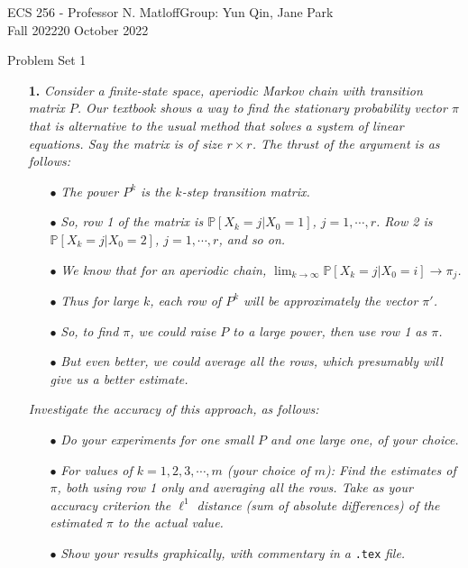 \documentclass [10pt] {article}
\newcommand{\ds}{\displaystyle}
\renewcommand{\P}{\mathbb{P}}
\begin{document}
{\noindent}ECS 256 - Professor N. Matloff\hfill Group: Yun Qin, Jane Park\\
Fall 2022\hfill 20 October 2022
\begin{center}{\Large Problem Set 1}\end{center}
\begin{enumerate}
\item[{\bf1.}] {\it Consider a finite-state space, aperiodic Markov chain with transition matrix $P$. Our textbook shows a way to find the stationary probability vector $\pi$ that is alternative to the usual method that solves a system of linear equations. Say the matrix is of size $r\times r$. The thrust of the argument is as follows:}
\begin{enumerate}
\item[$\bullet$]{\it The power $P^k$ is the $k$-step transition matrix.}
\item[$\bullet$]{\it So, row 1 of the matrix is $\P[X_k = j | X_0 = 1]$, $j = 1,\cdots,r$. Row 2 is $\P[X_k = j | X_0 = 2]$, $j = 1,\cdots,r$, and so on.}
\item[$\bullet$]{\it We know that for an aperiodic chain, $\ds\lim_{k\to\infty}\P[X_k = j | X_0 = i]\to\pi_j$.}
\item[$\bullet$]{\it Thus for large $k$, each row of $P^k$ will be approximately the vector $\pi'$.}
\item[$\bullet$]{\it So, to find $\pi$, we could raise $P$ to a large power, then use row 1 as $\pi$.}
\item[$\bullet$]{\it But even better, we could average all the rows, which presumably will give us a better estimate.}
\end{enumerate}
{\it Investigate the accuracy of this approach, as follows:}
\begin{enumerate}
\item[$\bullet$]{\it Do your experiments for one small $P$ and one large one, of your choice.}
\item[$\bullet$]{\it For values of $k = 1,2,3,\cdots,m$ (your choice of $m$): Find the estimates of $\pi$, both using row 1 only and averaging all the rows. Take as your accuracy criterion the $\ell^1$ distance (sum of absolute differences) of the estimated $\pi$ to the actual value.}
\item[$\bullet$]{\it Show your results graphically, with commentary in a }\texttt{.tex} {\it file.}
\end{enumerate}


\end{enumerate}
\end{document}
